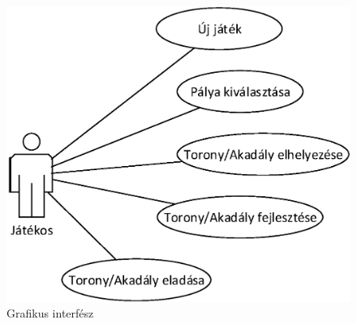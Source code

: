 \begin{figure}[H]
\begin{center}
\includegraphics[width=17cm]{chapters/chapter02/images/2_4_2_use_case_diagram.eps}
\caption{Grafikus interfész}
\label{fig:Use-case_diagram}
\end{center}
\end{figure}


